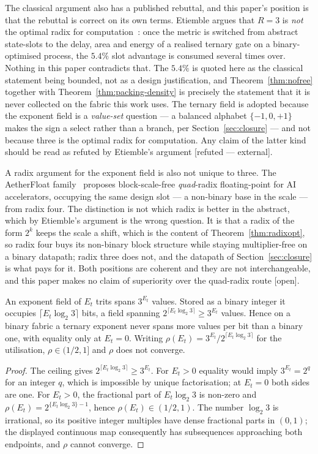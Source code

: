 The classical argument also has a published rebuttal, and this paper's position is
that the rebuttal is correct on its own terms. Etiemble argues that $R=3$ is
\emph{not} the optimal radix for computation~\cite{etiemble2019}: once the metric
is switched from abstract state-slots to the delay, area and energy of a realised
ternary gate on a binary-optimised process, the $5.4\%$ slot advantage is consumed
several times over. Nothing in this paper contradicts that. The $5.4\%$ is quoted
here as the classical statement being bounded, not as a design justification, and
Theorem~\ref{thm:nofree} together with Theorem~\ref{thm:packing-density} is
precisely the statement that it is never collected on the fabric this work uses.
The ternary field is adopted because the exponent field is a \emph{value-set}
question --- a balanced alphabet $\{-1,0,+1\}$ makes the sign a select rather than
a branch, per Section~\ref{sec:closure} --- and not because three is the optimal
radix for computation. Any claim of the latter kind should be read as refuted by
Etiemble's argument [refuted --- external].

A radix argument for the exponent field is also not unique to three. The
AetherFloat family~\cite{aetherfloat} proposes block-scale-free \emph{quad}-radix
floating-point for AI accelerators, occupying the same design slot --- a
non-binary base in the scale --- from radix four. The distinction is not which
radix is better in the abstract, which by Etiemble's argument is the wrong
question. It is that a radix of the form $2^{k}$ keeps the scale a shift, which is
the content of Theorem~\ref{thm:radixopt}, so radix four buys its non-binary block
structure while staying multiplier-free on a binary datapath; radix three does
not, and the datapath of Section~\ref{sec:closure} is what pays for it. Both
positions are coherent and they are not interchangeable, and this paper makes no
claim of superiority over the quad-radix route [open].

\begin{theorem}
\label{thm:nofree}
An exponent field of $E_t$ trits spans $3^{E_t}$ values. Stored as a binary
integer it occupies $\lceil E_t\log_2 3\rceil$ bits, a field spanning
$2^{\lceil E_t\log_2 3\rceil} \geq 3^{E_t}$ values. Hence on a binary fabric a
ternary exponent never spans more values per bit than a binary one, with equality
only at $E_t = 0$. Writing $\rho(E_t) = 3^{E_t}/2^{\lceil E_t\log_2 3\rceil}$ for
the utilisation, $\rho \in (1/2, 1]$ and $\rho$ does not converge.
\end{theorem}
\begin{proof}
The ceiling gives $2^{\lceil E_t\log_2 3\rceil}\geq3^{E_t}$.  For
$E_t>0$ equality would imply $3^{E_t}=2^q$ for an integer $q$, which is
impossible by unique factorisation; at $E_t=0$ both sides are one.  For
$E_t>0$, the fractional part of $E_t\log_2 3$ is non-zero and
$\rho(E_t)=2^{\{E_t\log_2 3\}-1}$, hence $\rho(E_t)\in(1/2,1)$.  The number
$\log_2 3$ is irrational, so its positive integer multiples have dense
fractional parts in $(0,1)$; the displayed continuous map consequently has
subsequences approaching both endpoints, and $\rho$ cannot converge.
\end{proof}


